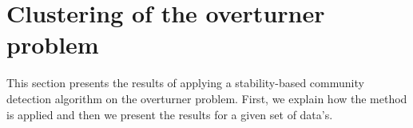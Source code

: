 \newpage
\chapter{Clustering of the overturner problem}

This section presents the results of applying a stability-based community detection algorithm on the overturner problem. First, we explain how the method is applied and then we present the results for a given set of data's.

% 	

